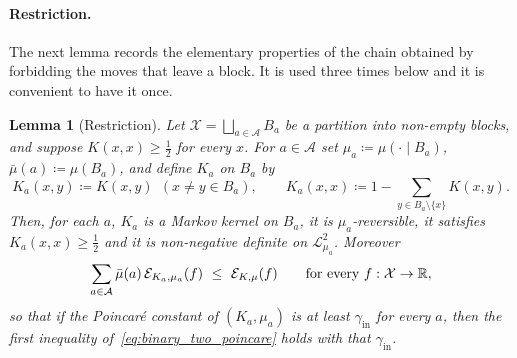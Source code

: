 \documentclass[aos]{imsart}%
\newcommand{\ambientspace}[0]{\mathcal{X}}
\newcommand{\bbR}[0]{\mathbb{R}}
\newcommand{\calL}[0]{\mathcal{L}}
\theoremstyle{plain}
\newtheorem{lemma}[theorem]{Lemma}
\theoremstyle{definition}
\begin{document}
    \paragraph{Restriction.}
    The next lemma records the elementary properties of the chain obtained by
    forbidding the moves that leave a block. It is used three times below and
    it is convenient to have it once.

    \begin{lemma}[Restriction]
        \label{lemma:binary_restriction}
        Let $\ambientspace=\bigsqcup_{a\in\mathcal{A}}B_a$ be a partition into
        non-empty blocks, and suppose $K(x,x)\geq\tfrac12$ for every $x$. For
        $a\in\mathcal A$ set $\mu_a\coloneq\mu(\cdot\mid B_a)$,
        $\bar\mu(a)\coloneq\mu(B_a)$, and define $K_a$ on $B_a$ by
        \begin{equation}
            \label{eq:binary_restriction}
            K_a(x,y)\coloneq K(x,y)\ \ (x\neq y\in B_a),
            \qquad
            K_a(x,x)\coloneq1-\sum_{y\in B_a\setminus\{x\}}K(x,y).
        \end{equation}
        Then, for each $a$, $K_a$ is a Markov kernel on $B_a$, it is
        $\mu_a$-reversible, it satisfies $K_a(x,x)\geq\tfrac12$ and it is
        non-negative definite on $\calL^{2}_{\mu_a}$. Moreover
        \begin{equation}
            \label{eq:binary_restriction_form}
            \sum_{a\in\mathcal{A}}\bar\mu(a)\,\Dir_{K_a,\mu_a}(f)
            \ \leq\ \Dir_{K,\mu}(f)
            \qquad\text{for every }f:\ambientspace\to\bbR,
        \end{equation}
        so that if the Poincar\'e constant of $(K_a,\mu_a)$ is at least
        $\gamma_{\mathrm{in}}$ for every $a$, then the first inequality
        of~\eqref{eq:binary_two_poincare} holds with that
        $\gamma_{\mathrm{in}}$.
    \end{lemma}
\end{document}
